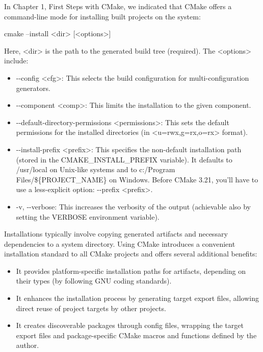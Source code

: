 
In Chapter 1, First Steps with CMake, we indicated that CMake offers a command-line mode for installing built projects on the system:

\begin{shell}
cmake --install <dir> [<options>]
\end{shell}

Here, <dir> is the path to the generated build tree (required). The <options> include:

\begin{itemize}
\item
-{}-config <cfg>: This selects the build configuration for multi-configuration generators.

\item
-{}-component <comp>: This limits the installation to the given component.

\item
-{}-default-directory-permissions <permissions>: This sets the default permissions for the installed directories (in <u=rwx,g=rx,o=rx> format).

\item
-{}-install-prefix <prefix>: This specifies the non-default installation path (stored in the CMAKE\_INSTALL\_PREFIX variable). It defaults to /usr/local on Unix-like systems and to c:/Program Files/\$\{PROJECT\_NAME\} on Windows.
Before CMake 3.21, you’ll have to use a less-explicit option: -{}-prefix <prefix>.

\item
-v, -{}-verbose: This increases the verbosity of the output (achievable also by setting the VERBOSE environment variable).
\end{itemize}

Installations typically involve copying generated artifacts and necessary dependencies to a system directory. Using CMake introduces a convenient installation standard to all CMake projects and offers several additional benefits:

\begin{itemize}
\item
It provides platform-specific installation paths for artifacts, depending on their types (by following GNU coding standards).

\item
It enhances the installation process by generating target export files, allowing direct reuse of project targets by other projects.

\item
It creates discoverable packages through config files, wrapping the target export files and package-specific CMake macros and functions defined by the author.
\end{itemize}

